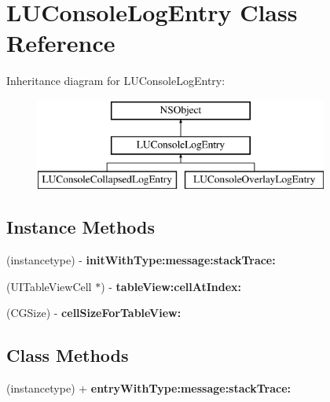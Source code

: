 \hypertarget{interface_l_u_console_log_entry}{}\section{L\+U\+Console\+Log\+Entry Class Reference}
\label{interface_l_u_console_log_entry}
Inheritance diagram for L\+U\+Console\+Log\+Entry\+:\begin{figure}[H]
\begin{center}
\leavevmode
\includegraphics[height=3.000000cm]{interface_l_u_console_log_entry}
\end{center}
\end{figure}
\subsection*{Instance Methods}
\begin{DoxyCompactItemize}
\item 
\mbox{\label{interface_l_u_console_log_entry_a494c37f93a8ecaab8018ce8ae7c716c4}} 
(instancetype) -\/ {\bfseries init\+With\+Type\+:message\+:stack\+Trace\+:}
\item 
\mbox{\label{interface_l_u_console_log_entry_a84febde8e8f168b7de0255c19afb8886}} 
(U\+I\+Table\+View\+Cell $\ast$) -\/ {\bfseries table\+View\+:cell\+At\+Index\+:}
\item 
\mbox{\label{interface_l_u_console_log_entry_ac42ff9e3e6c4f2d4a368fa59ac29d62a}} 
(C\+G\+Size) -\/ {\bfseries cell\+Size\+For\+Table\+View\+:}
\end{DoxyCompactItemize}
\subsection*{Class Methods}
\begin{DoxyCompactItemize}
\item 
\mbox{\label{interface_l_u_console_log_entry_a91c49be447900672610b3684b91a1eb1}} 
(instancetype) + {\bfseries entry\+With\+Type\+:message\+:stack\+Trace\+:}
\end{DoxyCompactItemize}
